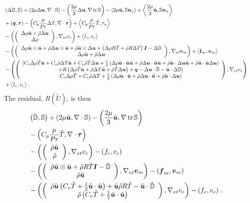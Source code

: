 \documentclass[Proposal.tex]{subfiles}
\begin{document}
\begin{equation}
\label{eq:compressibleJacobian}
\begin{aligned}
	&\LRp{\Delta\mathbb{D},\mathbb{S}}+\LRp{2\mu\Delta\bfu,\Div\mathbb{S}}-\LRp{\frac{2\mu}{3}\Delta\bfu,\Grad\trace{\mathbb{S}}}
	-\LRa{2\mu\hat\bfu,\mathbb{S}\bfn_x}+\LRa{\frac{2\mu}{3}\hat\bfu,\mathbb{S}\bfn_x}\\
	&+\LRp{\bfq,\bftau}-\LRp{C_p\frac{\mu}{Pr}\Delta T,\Div\bftau}+\LRa{C_p\frac{\mu}{Pr}\hat T,\tau_n}\\
	&-\LRp{\vecttwo{\Delta\rho\tilde\bfu+\tilde\rho\Delta\bfu}
	{\Delta\rho},\Gradxt v_c}
	+\LRa{\hat t_c,v_c}\\
	&-\LRp{\vecttwo{\Delta\rho\tilde\bfu\otimes\tilde\bfu+\tilde\rho\Delta\bfu\otimes\tilde\bfu+\tilde\rho\tilde\bfu\otimes\Delta\bfu
	+\LRp{\Delta\rho R\tilde T+\tilde\rho R\Delta T}\bfI-\Delta\mathbb{D}}
	{\Delta\rho\tilde\bfu+\tilde\rho\Delta\bfu},\Gradxt\bfv_m}
	+\LRa{\hat\bft_m,\bfv_m}\\
	&-\LRp{\vectthree{[C_v\Delta\rho\tilde T\tilde\bfu+C_v\tilde\rho\Delta T\tilde\bfu+C_v\tilde\rho\tilde T\Delta\bfu
	+\frac{1}{2}\LRp{\Delta\rho\tilde\bfu\cdot\tilde\bfu\tilde\bfu+\tilde\rho\Delta\bfu\cdot\tilde\bfu\tilde\bfu
	+\tilde\rho\tilde\bfu\cdot\Delta\bfu\tilde\bfu+\tilde\rho\tilde\bfu\cdot\tilde\bfu\Delta\bfu}}
	{+R\LRp{\Delta\rho\tilde T\tilde\bfu+\tilde\rho\Delta T\tilde\bfu+\tilde\rho\tilde T\Delta\bfu}
	+\bfq-\Delta\bfu\cdot\tilde{\mathbb{D}}-\tilde\bfu\cdot\Delta\mathbb{D}]}
	{C_v\Delta\rho\tilde T+C_v\tilde\rho\Delta T
	+\frac{1}{2}\LRp{\Delta\rho\tilde\bfu\cdot\tilde\bfu+\tilde\rho\Delta\bfu\cdot\tilde\bfu+\tilde\rho\tilde\bfu\cdot\Delta\bfu}},\Gradxt v_e}\\
	&+\LRa{\hat t_e,v_e}\,.
\end{aligned}
\end{equation}
The residual, $R(\tilde U)$, is then
\begin{equation}
\begin{aligned}
	&\left( \tilde{\mathbb{D}},\mathbb{S} \right)+\left( 2\mu\tilde{\boldsymbol u},\nabla\cdot\mathbb{S} \right)-\left( \frac{2\mu}{3}\tilde{\boldsymbol u},\nabla\operatorname*{tr}{\mathbb{S}} \right)\\
	&-\left( C_p\frac{\mu}{Pr}\tilde T,\nabla\cdot\boldsymbol\tau \right)\\
	&-\left( \left( \begin{array}{c} \tilde\rho\tilde{\boldsymbol u}\\ \tilde\rho\\ \end{array} \right),\nabla_{xt} v_c \right)-\left( f_c,v_c \right)\\
	&-\left( \left( \begin{array}{c} \tilde\rho\tilde{\boldsymbol u}\otimes\tilde{\boldsymbol u}+\tilde\rho R\tilde T\boldsymbol I-\tilde{\mathbb{D}}\\ \tilde\rho\tilde{\boldsymbol u}\\ \end{array} \right),
	\nabla_{xt}\boldsymbol v_m \right)-\left( \boldsymbol f_m,\boldsymbol v_m \right)\\
	&-\left( \left( \begin{array}{c} \tilde\rho\tilde{\boldsymbol u}\left( C_v\tilde T+\frac{1}{2}\tilde{\boldsymbol u}\cdot\tilde{\boldsymbol u} \right)+\tilde{\boldsymbol u}\tilde\rho R\tilde T
	-\tilde{\boldsymbol u}\cdot\tilde{\mathbb{D}}\\ \tilde\rho\left( C_v\tilde T+\frac{1}{2}\tilde{\boldsymbol u}\cdot\tilde{\boldsymbol u} \right)\\ \end{array} \right),
	\nabla_{xt} v_e \right)-\left( f_e,v_e \right)\,.
\end{aligned}
\end{equation}
\end{document}
